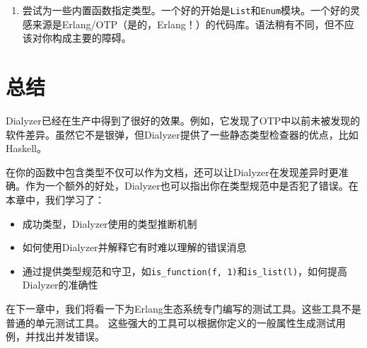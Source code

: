 \begin{enumerate}
\def\labelenumi{\arabic{enumi}.}
\setcounter{enumi}{2}

\item
  尝试为一些内置函数指定类型。一个好的开始是\texttt{List}和\texttt{Enum}模块。一个好的灵感来源是Erlang/OTP（是的，Erlang！）的代码库。语法稍有不同，但不应该对你构成主要的障碍。
\end{enumerate}

\section{总结}

Dialyzer已经在生产中得到了很好的效果。例如，它发现了OTP中以前未被发现的软件差异。虽然它不是银弹，但Dialyzer提供了一些静态类型检查器的优点，比如Haskell。

在你的函数中包含类型不仅可以作为文档，还可以让Dialyzer在发现差异时更准确。作为一个额外的好处，Dialyzer也可以指出你在类型规范中是否犯了错误。在本章中，我们学习了：

\begin{itemize}

\item
  成功类型，Dialyzer使用的类型推断机制
\item
  如何使用Dialyzer并解释它有时难以理解的错误消息
\item
  通过提供类型规范和守卫，如\texttt{is\_function(f, 1)}和\texttt{is\_list(l)}，如何提高Dialyzer的准确性
\end{itemize}

在下一章中，我们将看一下为Erlang生态系统专门编写的测试工具。这些工具不是普通的单元测试工具。
这些强大的工具可以根据你定义的一般属性生成测试用例，并找出并发错误。
